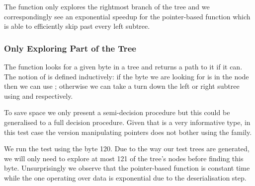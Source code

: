 The  function only explores the rightmost
branch of the tree and we correspondingly see an exponential speedup
for the pointer-based function which is able to efficiently skip past
every left subtree.

\noindent
\begin{minipage}{.5\textwidth}
\end{minipage}\hfill
\begin{minipage}{.45\textwidth}
\end{minipage}

\subsubsection{Only Exploring Part of the Tree}


The  function looks for a given byte in a tree
and returns a path to it if it can.
%
The notion of  is defined inductively: if the
 byte we are looking for is in the node then
we can use ; otherwise we can take a turn down
the left or right subtree using  and 
respectively.


To save space we only present a semi-decision procedure but this could
be generalised to a full decision procedure.
%
Given that  is a very informative type, in this test
case the version manipulating pointers does not bother using the
 family.

We run the test using the byte 120.
%
Due to the way our test trees are generated, we will only need to
explore at most 121 of the tree's nodes before finding this byte.
%
Unsurprisingly we observe that the pointer-based function is
constant time while the one operating over data is exponential
due to the deserialisation step.

\noindent
\begin{minipage}{.5\textwidth}
\end{minipage}\hfill
\begin{minipage}{.45\textwidth}
\end{minipage}

